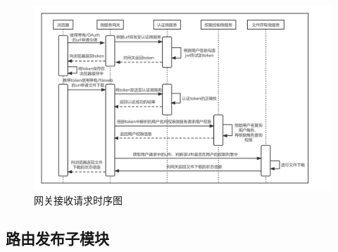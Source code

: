 \begin{figure}[htb]
    \centering
    \includegraphics[width=1\textwidth]{my_figures/chapter5/网关接收请求时序图.png}
    \caption{网关接收请求时序图}
    \label{fig:网关接收请求时序图}
\end{figure}

\subsection{路由发布子模块}




